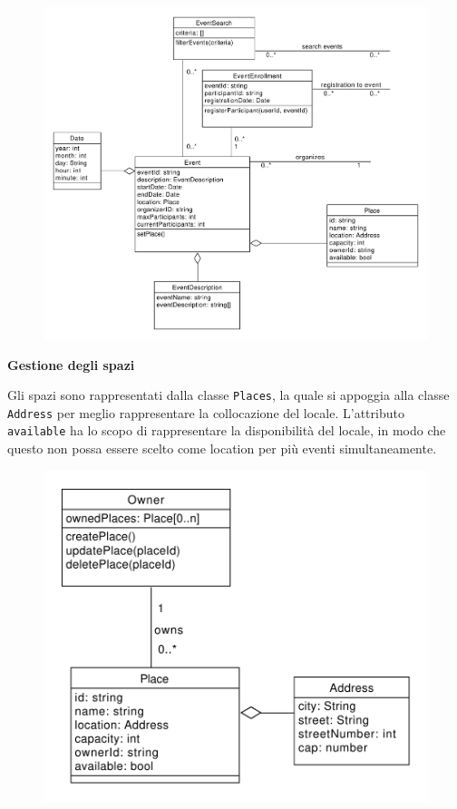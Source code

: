 \documentclass[9pt]{extarticle}
\begin{document}
\begin{figure}[!htb]
	\centering
	\includegraphics[width=\linewidth]{./images/classDiagramEventEnrollment.pdf}
	\caption{}
	\label{fig:classDiagramEventEnrollment}
\end{figure}

\textbf{Gestione degli spazi}

Gli spazi sono rappresentati dalla classe \verb*|Places|, la quale si appoggia alla classe \verb*|Address| per meglio rappresentare la collocazione del locale. L'attributo \verb*|available| ha lo scopo di rappresentare la disponibilità del locale, in modo che questo non possa essere scelto come location per più eventi simultaneamente.

\newpage
\begin{figure}[!htb]
	\centering
	\includegraphics[width=.6\linewidth]{./images/classDiagramPlaces.pdf}
	\caption{}
	\label{fig:classDiagramPlaces}
\end{figure}
\end{document}
